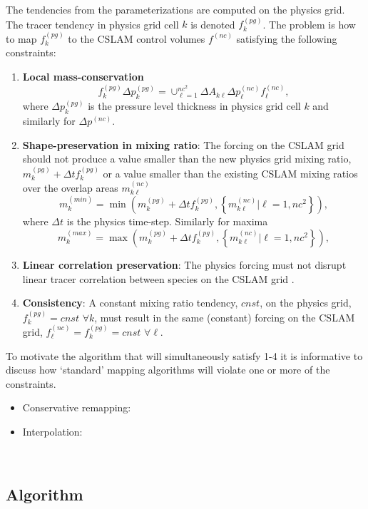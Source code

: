 The tendencies from the parameterizations are computed on the physics grid. The tracer tendency in physics grid cell $k$ is denoted $f_k^{(pg)}$. The problem is how to map $f_k^{(pg)}$ to the CSLAM control volumes $f^{(nc)}$ satisfying the following constraints:
\begin{enumerate}
\item {\bf{Local mass-conservation}}
\begin{equation}
f_k^{(pg)}\Delta p^{(pg)}_k=\cup_{\ell=1}^{nc^2}\Delta A_{k\ell}\Delta p^{(nc)}_\ell f^{(nc)}_\ell,
\end{equation}
where $\Delta p^{(pg)}_k$ is the pressure level thickness in physics grid cell $k$ and similarly for $\Delta p^{(nc)}$.
\item {\bf{Shape-preservation in mixing ratio}}: The forcing on the CSLAM grid should not produce a value smaller than the new physics grid mixing ratio, $m^{(pg)}_k+\Delta tf_k^{(pg)}$ or a value smaller than the existing CSLAM mixing ratios over the overlap areas $m^{(nc)}_{k\ell}$
\begin{equation}
m_k^{(min)}=\min \left( m^{(pg)}_k+\Delta t f_k^{(pg)},\left\{ m^{(nc)}_{k\ell} |\ell=1,nc^2\right\} \right),
\end{equation}
where $\Delta t$ is the physics time-step. Similarly for maxima
\begin{equation}
m_k^{(max)}=\max \left( m^{(pg)}_k+\Delta t f_k^{(pg)},\left\{ m^{(nc)}_{k\ell} |\ell=1,nc^2\right\} \right),
\end{equation}
\item {\bf{Linear correlation preservation}}: The physics forcing must not disrupt linear tracer correlation between species on the CSLAM grid \citep[see, e.g., ][]{LT2011QJR}.
\item {\bf{Consistency}}: A constant mixing ratio tendency, $cnst$, on the physics grid, $f_k^{(pg)}=cnst$ $\forall k$, must result in the same (constant) forcing on the CSLAM grid, $f_\ell^{(nc)}=f_k^{(pg)}=cnst$ $\forall \ell$.
\end{enumerate}
To motivate the algorithm that will simultaneously satisfy 1-4 it is informative to discuss how `standard' mapping algorithms will violate one or more of the constraints.
\begin{itemize}
\item Conservative remapping: 
\item Interpolation:
\end{itemize}

{\color{red}{some text about how challenging it is to satisfy 1-3 simultaneously}}\\
\subsection{Algorithm}


